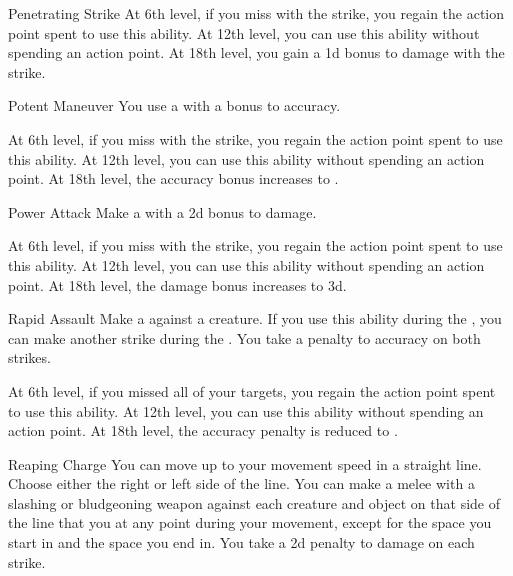 {\begin{ability}{Penetrating Strike}
                At 6th level, if you miss with the strike, you regain the action point spent to use this ability.
                At 12th level, you can use this ability without spending an action point.
                At 18th level, you gain a \plus1d bonus to damage with the strike.
            \end{ability}

            \begin{ability}{Potent Maneuver}
                You use a  with a  bonus to accuracy.

                At 6th level, if you miss with the strike, you regain the action point spent to use this ability.
                At 12th level, you can use this ability without spending an action point.
                At 18th level, the accuracy bonus increases to .
            \end{ability}

            \begin{ability}{Power Attack}
                Make a  with a \plus2d bonus to damage.

                At 6th level, if you miss with the strike, you regain the action point spent to use this ability.
                At 12th level, you can use this ability without spending an action point.
                At 18th level, the damage bonus increases to \plus3d.
            \end{ability}

            \begin{ability}{Rapid Assault}
                Make a  against a creature.
                If you use this ability during the , you can make another strike during the .
                You take a  penalty to accuracy on both strikes.

                At 6th level, if you missed all of your targets, you regain the action point spent to use this ability.
                At 12th level, you can use this ability without spending an action point.
                At 18th level, the accuracy penalty is reduced to .
            \end{ability}

            \begin{ability}{Reaping Charge}
                You can move up to your movement speed in a straight line.
                Choose either the right or left side of the line.
                You can make a melee  with a slashing or bludgeoning weapon against each creature and object on that side of the line that you  at any point during your movement, except for the space you start in and the space you end in.
                You take a \minus2d penalty to damage on each strike.


\end{ability}}
